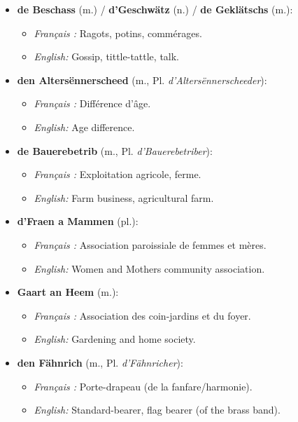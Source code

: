\begin{itemize}
    \item \textbf{de Beschass} (m.) / \textbf{d'Geschwätz} (n.) / \textbf{de Geklätschs} (m.):
    \begin{itemize}
        \item \textit{Français :} Ragots, potins, commérages.
        \item \textit{English:} Gossip, tittle-tattle, talk.
    \end{itemize}

    \item \textbf{den Altersënnerscheed} (m., Pl. \textit{d'Altersënnerscheeder}):
    \begin{itemize}
        \item \textit{Français :} Différence d'âge.
        \item \textit{English:} Age difference.
    \end{itemize}

    \item \textbf{de Bauerebetrib} (m., Pl. \textit{d'Bauerebetriber}):
    \begin{itemize}
        \item \textit{Français :} Exploitation agricole, ferme.
        \item \textit{English:} Farm business, agricultural farm.
    \end{itemize}

    \item \textbf{d'Fraen a Mammen} (pl.):
    \begin{itemize}
        \item \textit{Français :} Association paroissiale de femmes et mères.
        \item \textit{English:} Women and Mothers community association.
    \end{itemize}

    \item \textbf{Gaart an Heem} (m.):
    \begin{itemize}
        \item \textit{Français :} Association des coin-jardins et du foyer.
        \item \textit{English:} Gardening and home society.
    \end{itemize}

    \item \textbf{den Fähnrich} (m., Pl. \textit{d'Fähnricher}):
    \begin{itemize}
        \item \textit{Français :} Porte-drapeau (de la fanfare/harmonie).
        \item \textit{English:} Standard-bearer, flag bearer (of the brass band).
    \end{itemize}


\end{itemize}
